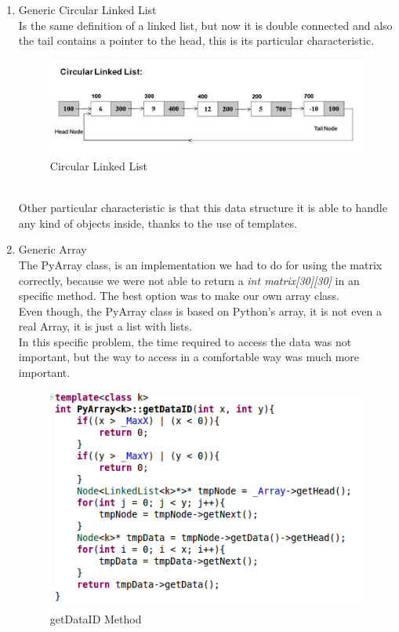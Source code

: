\documentclass[twocolumn]{IEEEtran}
\begin{document}
	\begin{enumerate}
		\item Generic Circular Linked List\\
        
        Is the same definition of a linked list, but now it is double connected and also the 
        tail contains a pointer to the head, this is its particular characteristic.
     	   \begin{figure}[h!]
				\centering
				\includegraphics[width=\columnwidth]{src/circularLinkedList.jpg}
				\caption{Circular Linked List}
			\end{figure}\\
		Other particular characteristic is that this data structure it is able to handle any 
        kind of objects inside, thanks to the use of templates.\\
        
        \item Generic Array\\
        The PyArray class, is an implementation we had to do for using the matrix correctly, because we were not able to return a \textit{int matrix[30][30]} in an specific method. The best option was to make our own array class.\\ 
        Even though, the PyArray class is based on Python's array, it is not even a real Array, it is just a list with lists.\\ 
        In this specific problem, the time required to access the data was not important, but the way to access in a comfortable way was much more important.\\

\begin{figure}[h!]
				\centering
				\includegraphics[width=\columnwidth]{src/getDataID.png}
				\caption{getDataID Method}
			\end{figure}
            

\end{enumerate}
\end{document}

